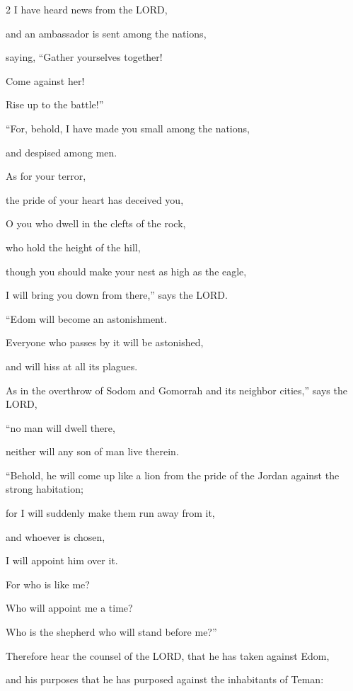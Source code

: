 \begin{multicols}{2}
\myverse{}I have heard news from the LORD,

and an ambassador is sent among the nations,

saying, “Gather yourselves together!

Come against her!

Rise up to the battle!”

\vspace{\baselineskip}

\myverse{}“For, behold, I have made you small among the nations,

and despised among men.


\myverse{}As for your terror,

the pride of your heart has deceived you,

O you who dwell in the clefts of the rock,

who hold the height of the hill,

though you should make your nest as high as the eagle,

I will bring you down from there,” says the LORD.


\myverse{}“Edom will become an astonishment.

Everyone who passes by it will be astonished,

and will hiss at all its plagues.


\myverse{}As in the overthrow of Sodom and Gomorrah and its neighbor
cities,” says the LORD,

“no man will dwell there,

neither will any son of man live therein.

\vspace{\baselineskip}

\myverse{}“Behold, he will come up like a lion from the pride of the
Jordan against the strong habitation;

for I will suddenly make them run away from it,

and whoever is chosen,

I will appoint him over it.

For who is like me?

Who will appoint me a time?

Who is the shepherd who will stand before me?”


\myverse{}Therefore hear the counsel of the LORD, that he has taken against
Edom,

and his purposes that he has purposed against the inhabitants of Teman:


\end{multicols}
